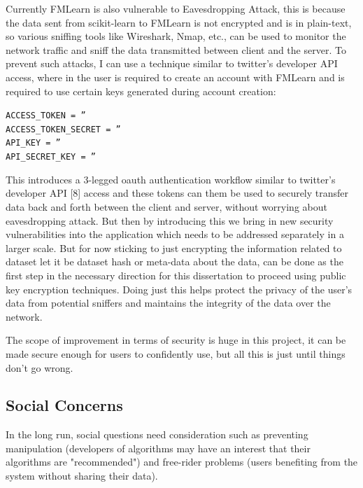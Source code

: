 Currently FMLearn is also vulnerable to Eavesdropping Attack, this is because the data sent from scikit-learn to FMLearn is not encrypted and is in plain-text, so various sniffing tools like Wireshark, Nmap, etc., can be used to monitor the network traffic and sniff the data transmitted between client and the server. To prevent such attacks, I can use a technique similar to twitter’s developer API access, where in the user is required to create an account with FMLearn and is required to use certain keys generated during account creation:

\quad\quad\quad\quad\quad\quad\quad\quad\quad\quad\quad\quad\quad\quad
\texttt{ACCESS\_TOKEN = ''\\}
\quad\quad\quad\quad\quad\quad\quad\quad\quad\quad\quad\quad\quad\quad
\texttt{ACCESS\_TOKEN\_SECRET = ''\\}
\quad\quad\quad\quad\quad\quad\quad\quad\quad\quad\quad\quad\quad\quad
\texttt{API\_KEY = ''\\}
\quad\quad\quad\quad\quad\quad\quad\quad\quad\quad\quad\quad\quad\quad
\texttt{API\_SECRET\_KEY = ''}

This introduces a 3-legged oauth authentication workflow similar to twitter’s developer API [8] access and these tokens can them be used to securely transfer data back and forth between the client and server, without worrying about eavesdropping attack. But then by introducing this we bring in new security vulnerabilities into the application which needs to be addressed separately in a larger scale. But for now sticking to just encrypting the information related to dataset let it be dataset hash or meta-data about the data, can be done as the first step in the necessary direction for this dissertation to proceed using public key encryption techniques. Doing just this helps protect the privacy of the user’s data from potential sniffers and maintains the integrity of the data over the network.

The scope of improvement in terms of security is huge in this project, it can be made secure enough for users to confidently use, but all this is just until things don’t go wrong.

\subsection{Social Concerns}
In the long run, social questions need consideration such as preventing manipulation (developers of algorithms may have an interest that their algorithms are "recommended") and free-rider problems (users benefiting from the system without sharing their data).

